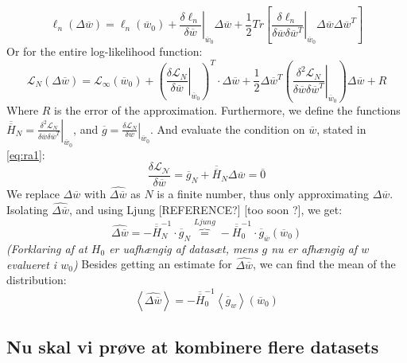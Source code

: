\begin{equation}
\ell_n(\Delta \overline{w}) = 
\ell_n\left(\overline{w}_0 \right) + 
\left. \frac{\delta \ell_n}{\delta \overline{w}} \right|_{\overline{w}_0} \Delta \overline{w} + 
\frac{1}{2} Tr \left[ \left. \frac{\delta \ell_n}{\delta \overline{w} \delta \overline{w}^T} \right|_{\overline{w}_0} \Delta \overline{w} \Delta \overline{w}^T \right] \label{eq:loglihood-oneObs}
\end{equation}
Or for the entire log-likelihood function:
\begin{equation}
\mathcal{L}_N(\Delta \overline{w}) = 
\mathcal{L}_\infty\left(\overline{w}_0\right) + 
\left(\left.\frac{\delta \mathcal{L}_N}{\delta \overline{w}}\right|_{\overline{w}_0} \right)^T \cdot \Delta \overline{w} +
\frac{1}{2} \Delta \overline{w}^T \left( \left. \frac{\delta^2 \mathcal{L}_N}{\delta \overline{w} \delta \overline{w}^T}\right|_{\overline{w}_0} \right) \Delta \overline{w} + R \label{eq:entireLogLike}
\end{equation}
Where $R$ is the error of the approximation. Furthermore, we define the functions $\overline{\overline{H}}_N = \left. \frac{\delta^2 \mathcal{L}_N}{\delta \overline{w} \delta \overline{w}^T}\right|_{\overline{w}_0}$, and $\overline{g} = \left.\frac{\delta \mathcal{L}_N}{\delta \overline{w}}\right|_{\overline{w}_0}$. And evaluate the condition on $\overline{w}$, stated in \eqref{eq:ra1}:
\begin{equation}
\frac{\delta \mathcal{L_N}}{\delta \overline{w}} = \overline{g}_N+\overline{\overline{H}}_N \Delta \overline{w} = \overline{0}
\end{equation}
We replace $\Delta \overline{w}$ with $\hat{\Delta \overline{w}}$  as $N$ is a finite number, thus only approximating $\Delta \overline{w}$. Isolating $\hat{\Delta \overline{w}}$, and using Ljung [REFERENCE?] [too soon ?], we get:
\begin{equation}
\hat{\Delta \overline{w}} = - \overline{\overline{H}}_N^{-1} \cdot \overline{g}_N \overbrace{=}^{Ljung} -\overline{\overline{H}}
_0^{-1} \cdot \overline{g}_{\overline{w}} \left( \overline{w}_0 \right)
\end{equation}
\emph{(Forklaring af at $H_0$ er uafhængig af datasæt, mens $g$ nu er afhængig af $w$ evalueret i $w_0$)}
Besides getting an estimate for $\hat{\Delta \overline{w}}$, we can find the mean of the distribution:
\[
\left\langle \hat{\Delta \overline{w}} \right\rangle = - \overline{\overline{H}}_0^{-1} \left\langle \overline{g}_w \right\rangle (\overline{w}_0)
\]

\subsection*{Nu skal vi prøve at kombinere flere datasets}

